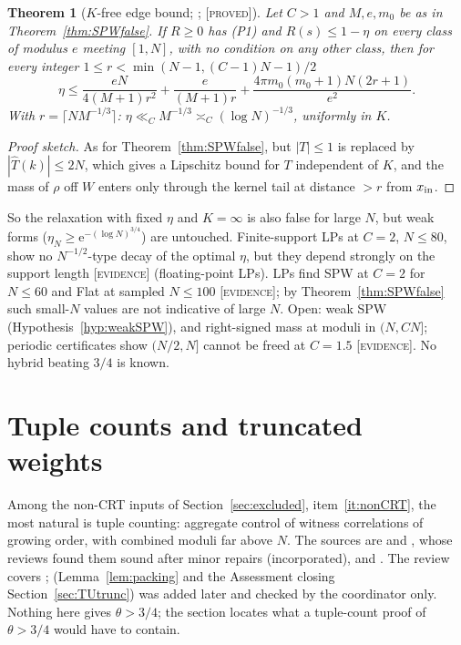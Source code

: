 \documentclass[10pt,reqno]{amsart}
\newtheorem{theorem}{Theorem}[section]
\theoremstyle{definition}
\theoremstyle{remark}
\newcommand{\e}{\mathrm e}
\newcommand{\lab}[1]{\textup{[\textsc{#1}]}}
\begin{document}
\begin{theorem}[$K$-free edge bound; {\cite[Thm~3.1]{SPW2}}; \lab{proved}]\label{thm:Kfree}
Let $C>1$ and $M,e,m_0$ be as in Theorem~\ref{thm:SPWfalse}.  If $R\geq0$ has (P1) and
$R(s)\leq1-\eta$ on every class of modulus $e$ meeting $[1,N]$, with no condition
on any other class, then for every integer $1\leq r<\min(N-1,(C-1)N-1)/2$
\[
 \eta\leq\frac{eN}{4(M+1)r^2}+\frac e{(M+1)r}+\frac{4\pi m_0(m_0+1)N(2r+1)}{e^2}.
\]
With $r=\lceil NM^{-1/3}\rceil$: $\eta\ll_CM^{-1/3}\asymp_C(\log N)^{-1/3}$, uniformly in $K$.
\end{theorem}
\begin{proof}[Proof sketch]
As for Theorem~\ref{thm:SPWfalse}, but $|T|\leq1$ is replaced by
$|\hat T(k)|\leq2N$, which gives a Lipschitz bound for $T$ independent of $K$, and
the mass of $\rho$ off $W$ enters only through the kernel tail at distance
$>r$ from $x_{\rm in}$.
\end{proof}
So the relaxation with fixed $\eta$ and $K=\infty$ is also false for large $N$,
but weak forms ($\eta_N\geq\e^{-(\log N)^{3/4}}$) are untouched.  Finite-support
LPs at $C=2$, $N\leq80$, show no $N^{-1/2}$-type decay of the optimal $\eta$, but
they depend strongly on the support length \cite[\S2]{SPW2}
\lab{evidence} (floating-point LPs).  LPs find SPW at $C=2$ for $N\leq60$ and
Flat at sampled $N\leq100$ \cite[\S\S5, 9]{IF2} \lab{evidence}; by
Theorem~\ref{thm:SPWfalse} such small-$N$ values are not indicative of large $N$.
Open: weak SPW (Hypothesis~\ref{hyp:weakSPW}), and right-signed mass at
moduli in $(N,CN]$; periodic certificates show $(N/2,N]$ cannot be freed at
$C=1.5$ \cite[\S10]{IF2} \lab{evidence}.  No hybrid beating $3/4$ is known.

\section{Tuple counts and truncated weights}\label{sec:TU}

Among the non-CRT inputs of Section~\ref{sec:excluded}, item~\ref{it:nonCRT}, the most
natural is tuple counting: aggregate control of witness correlations of
growing order, with combined moduli far above $N$.  The sources are
\cite{TU} and \cite{TU2}, whose reviews \cite{TUrev,TU2rev} found them sound
after minor repairs (incorporated), and \cite[\S\S5, 7]{KA3}.  The review
\cite{KA3rev} covers \cite[\S5]{KA3}; \cite[\S7]{KA3} (Lemma~\ref{lem:packing}
and the Assessment closing Section~\ref{sec:TUtrunc}) was added later and
checked by the coordinator only.  Nothing here gives $\theta>3/4$; the section
locates what a tuple-count proof of $\theta>3/4$ would have to contain.
\end{document}
